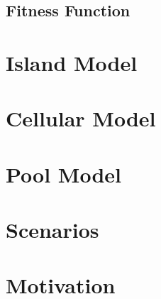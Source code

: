 \documentclass{article}
\begin{document}
\subsection{Fitness Function}\label{subsection:fitness function}


\section{Island Model}\label{section:island model}


\section{Cellular Model}\label{section:cellular model}


\section{Pool Model}\label{section:pool model}


\section{Scenarios}\label{section:scenarios}


\section{Motivation}\label{section:motivation}
\end{document}
